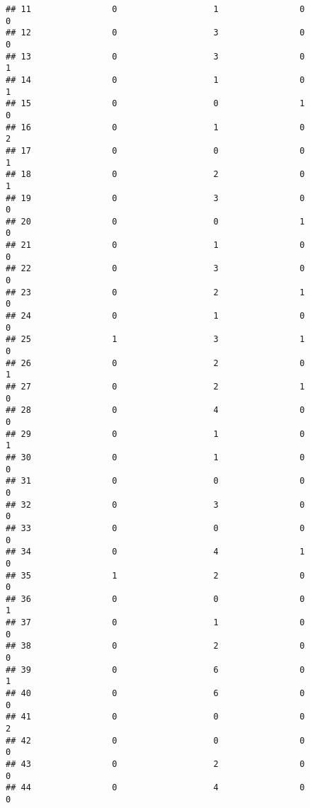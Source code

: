 \documentclass[
]{article}
\begin{document}
\begin{verbatim}
## 11                0                   1                0                0
## 12                0                   3                0                0
## 13                0                   3                0                1
## 14                0                   1                0                1
## 15                0                   0                1                0
## 16                0                   1                0                2
## 17                0                   0                0                1
## 18                0                   2                0                1
## 19                0                   3                0                0
## 20                0                   0                1                0
## 21                0                   1                0                0
## 22                0                   3                0                0
## 23                0                   2                1                0
## 24                0                   1                0                0
## 25                1                   3                1                0
## 26                0                   2                0                1
## 27                0                   2                1                0
## 28                0                   4                0                0
## 29                0                   1                0                1
## 30                0                   1                0                0
## 31                0                   0                0                0
## 32                0                   3                0                0
## 33                0                   0                0                0
## 34                0                   4                1                0
## 35                1                   2                0                0
## 36                0                   0                0                1
## 37                0                   1                0                0
## 38                0                   2                0                0
## 39                0                   6                0                1
## 40                0                   6                0                0
## 41                0                   0                0                2
## 42                0                   0                0                0
## 43                0                   2                0                0
## 44                0                   4                0                0

\end{verbatim}
\end{document}
